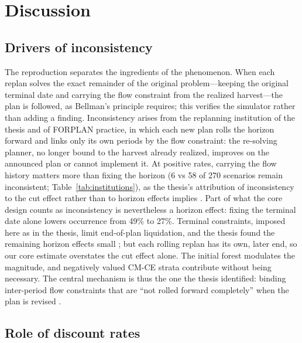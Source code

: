 \section{Discussion}

\hypertarget{what-drives-the-inconsistency}{%
\subsection{Drivers of inconsistency}\label{what-drives-the-inconsistency}}

The reproduction separates the ingredients of the phenomenon. When each replan solves the exact remainder of the original problem---keeping the original terminal date and carrying the flow constraint from the realized harvest---the plan is followed, as Bellman's principle requires; this verifies the simulator rather than adding a finding. Inconsistency arises from the replanning institution of the thesis and of FORPLAN practice, in which each new plan rolls the horizon forward and links only its own periods by the flow constraint: the re-solving planner, no longer bound to the harvest already realized, improves on the announced plan or cannot implement it. At positive rates, carrying the flow history matters more than fixing the horizon (6 vs 58 of 270 scenarios remain inconsistent; Table~\ref{tab:institutions}), as the thesis's attribution of inconsistency to the cut effect rather than to horizon effects implies \citep[pp.~120, 123]{daugherty1991credibility}. Part of what the core design counts as inconsistency is nevertheless a horizon effect: fixing the terminal date alone lowers occurrence from 49\% to 27\%. Terminal constraints, imposed here as in the thesis, limit end-of-plan liquidation, and the thesis found the remaining horizon effects small \citep[pp.~119, 123]{daugherty1991credibility}; but each rolling replan has its own, later end, so our core estimate overstates the cut effect alone. The initial forest modulates the magnitude, and negatively valued CM-CE strata contribute without being necessary. The central mechanism is thus the one the thesis identified: binding inter-period flow constraints that are ``not rolled forward completely'' when the plan is revised \citep[p.~134]{daugherty1991credibility}.

\hypertarget{the-discount-rate-nuance}{%
\subsection{Role of discount rates}\label{the-discount-rate-nuance}}

